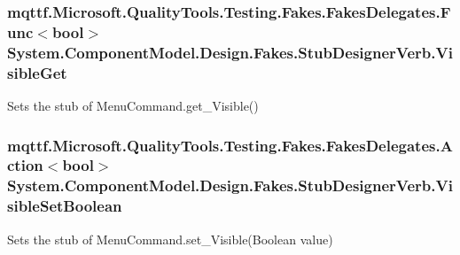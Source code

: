 \hypertarget{class_system_1_1_component_model_1_1_design_1_1_fakes_1_1_stub_designer_verb_a9a54a9a98959dad066e703fc82d52706}{
\subsubsection[{Visible\-Get}]{\setlength{\rightskip}{0pt plus 5cm}mqttf.\-Microsoft.\-Quality\-Tools.\-Testing.\-Fakes.\-Fakes\-Delegates.\-Func$<$bool$>$ System.\-Component\-Model.\-Design.\-Fakes.\-Stub\-Designer\-Verb.\-Visible\-Get}}\label{class_system_1_1_component_model_1_1_design_1_1_fakes_1_1_stub_designer_verb_a9a54a9a98959dad066e703fc82d52706}


Sets the stub of Menu\-Command.\-get\-\_\-\-Visible()

\hypertarget{class_system_1_1_component_model_1_1_design_1_1_fakes_1_1_stub_designer_verb_a11a87d834a52ad8b5f003ac00c0f30b0}{
\subsubsection[{Visible\-Set\-Boolean}]{\setlength{\rightskip}{0pt plus 5cm}mqttf.\-Microsoft.\-Quality\-Tools.\-Testing.\-Fakes.\-Fakes\-Delegates.\-Action$<$bool$>$ System.\-Component\-Model.\-Design.\-Fakes.\-Stub\-Designer\-Verb.\-Visible\-Set\-Boolean}}\label{class_system_1_1_component_model_1_1_design_1_1_fakes_1_1_stub_designer_verb_a11a87d834a52ad8b5f003ac00c0f30b0}


Sets the stub of Menu\-Command.\-set\-\_\-\-Visible(\-Boolean value)



